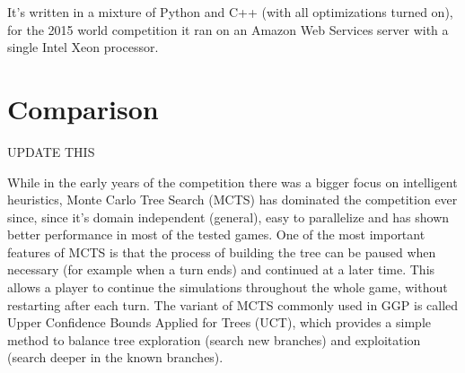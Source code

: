 It's written in a mixture of Python and C++ (with all optimizations turned on), for the 2015 world competition it ran on an Amazon Web Services server with a single Intel Xeon processor. 

\section{Comparison}

UPDATE THIS

While in the early years of the competition there was a bigger focus on intelligent heuristics, Monte Carlo Tree Search (MCTS) has dominated the competition ever since, since it’s domain independent (general), easy to parallelize and has shown better performance in most of the tested games. One of the most important features of MCTS is that the process of building the tree can be paused when necessary (for example when a turn ends) and continued at a later time. This allows a player to continue the simulations throughout the whole game, without restarting after each turn.
The variant of MCTS commonly used in GGP is called Upper Confidence Bounds Applied for Trees (UCT), which provides a simple method to balance tree exploration (search new branches) and exploitation (search deeper in the known branches).
